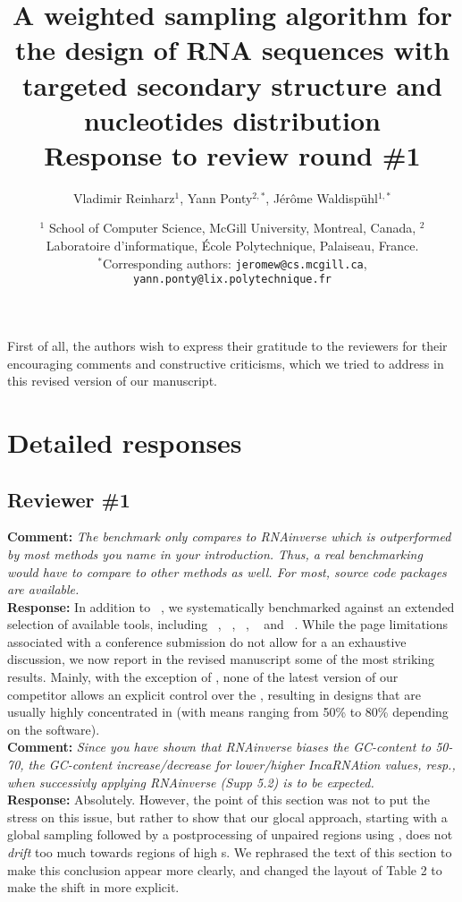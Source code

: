 \documentclass[11pt,hyperref,draft]{article} %
\title{A weighted sampling algorithm for the design of RNA sequences with targeted secondary structure and nucleotides distribution\\Response to review round \#1}
\author{Vladimir Reinharz$^1$, Yann Ponty$^{2,*}$, J\'er\^{o}me Waldisp\"{u}hl$^{1,*}$}
\date{$^1$ School of Computer Science, McGill University, Montreal, Canada, $^2$ Laboratoire d'informatique, \'Ecole Polytechnique, Palaiseau, France.\\ \small $^*$Corresponding authors: \texttt{jeromew@cs.mcgill.ca}, \texttt{yann.ponty@lix.polytechnique.fr}}
\newcommand{\Answer}[1]{\noindent\textsf{\textbf{Response: }}{\sf#1}\\}
\newcommand{\Comment}[1]{\noindent\textsf{\textbf{Comment: }}{\it#1}\\[.5em]}
\begin{document}
\maketitle

First of all, the authors wish to express their gratitude to the reviewers for their encouraging comments and constructive criticisms, which we tried to address in this revised version of our manuscript.


\section{Detailed responses}

\subsection{Reviewer \#1}

\Comment{The benchmark only compares to RNAinverse which is outperformed by most methods you name in your introduction. Thus, a real benchmarking would have to compare to other methods as well. For most, source code packages are available.}
\Answer{In addition to \RNAinverse~\cite{Hofacker:1994}, we systematically benchmarked \ourprog against an extended selection of available tools, including \NUPACK~\cite{Zadeh:2011fk}, \frankenstein~\cite{Lyngso:2012vn},  \RNASSD~\cite{Aguirre-Hernandez:2007kx}, \INFORNA~\cite{Busch:2006uq} and \RNAexinv~\cite{Avihoo:2011fk}.
While the page limitations associated with a conference submission do not allow for a an exhaustive discussion, we now report in the revised manuscript some of the most striking results. Mainly, with the exception of \RNASSD, none of the latest version of our competitor allows an explicit control over the \GCContent, resulting in designs that are usually highly concentrated in \GCContent (with means ranging from 50\% to 80\% depending on the software).
}

\Comment{Since you have shown that RNAinverse biases the GC-content to 50-70, the GC-content increase/decrease for lower/higher IncaRNAtion values, resp., when successivly applying RNAinverse (Supp 5.2) is to be expected.}
\Answer{Absolutely. However, the point of this section was not to put the stress on this issue, but rather to show that our glocal approach, starting with a global sampling followed by a postprocessing of unpaired regions using \RNAinverse, does not {\em drift} too much towards regions of high \GCContent{}s. We rephrased the text of this section to make this conclusion appear more clearly, and changed the layout of Table 2 to make the shift in \GC more explicit.}
\end{document}
